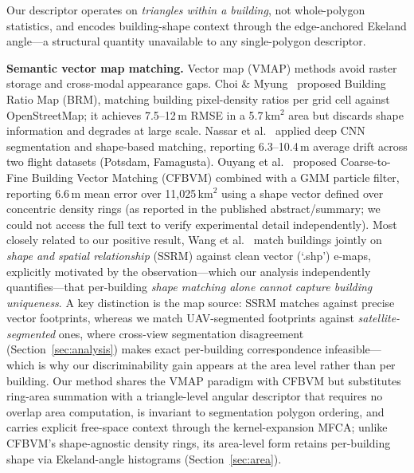 \documentclass[10pt]{article}
\theoremstyle{plain}
\theoremstyle{definition}
\begin{document}
Our descriptor operates on \emph{triangles within a building}, not
whole-polygon statistics, and encodes building-shape context through the
edge-anchored Ekeland angle---a structural quantity unavailable to any
single-polygon descriptor.


\noindent\textbf{Semantic vector map matching.}
Vector map (VMAP) methods avoid raster storage and cross-modal appearance gaps.
Choi \& Myung~\cite{choi2020brm} proposed Building Ratio Map (BRM), matching
building pixel-density ratios per grid cell against OpenStreetMap; it achieves
7.5--12\,m RMSE in a 5.7\,km$^2$ area but discards shape information
and degrades at large scale.
Nassar et al.~\cite{nassar2018deep} applied deep CNN segmentation and
shape-based matching, reporting 6.3--10.4\,m average drift across two flight
datasets (Potsdam, Famagusta).
Ouyang et al.~\cite{ouyang2024cfbvm} proposed Coarse-to-Fine Building Vector
Matching (CFBVM) combined with a GMM particle filter, reporting 6.6\,m mean
error over 11,025\,km$^2$ using a shape vector defined over concentric
density rings (as reported in the published abstract/summary; we could not
access the full text to verify experimental detail independently).
Most closely related to our positive result, Wang et al.~\cite{ssrm2024}
match buildings jointly on \emph{shape and spatial relationship} (SSRM) against
clean vector (`.shp') e-maps, explicitly motivated by the observation---which
our analysis independently quantifies---that per-building \emph{shape matching
alone cannot capture building uniqueness}. A key distinction is the map source:
SSRM matches against precise vector footprints, whereas we match UAV-segmented
footprints against \emph{satellite-segmented} ones, where cross-view
segmentation disagreement (Section~\ref{sec:analysis}) makes exact per-building
correspondence infeasible---which is why our discriminability gain appears at the
area level rather than per building.
Our method shares the VMAP paradigm with CFBVM but substitutes ring-area
summation with a triangle-level angular descriptor that requires no overlap
area computation, is invariant to segmentation polygon ordering, and carries
explicit free-space context through the kernel-expansion MFCA; unlike CFBVM's
shape-agnostic density rings, its area-level form retains per-building shape via
Ekeland-angle histograms (Section~\ref{sec:area}).
\end{document}
